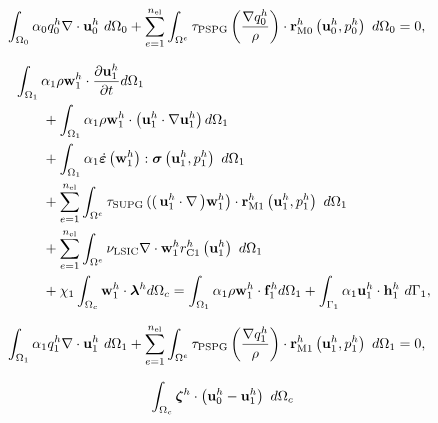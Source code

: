 \documentclass[tese_patricia]{subfiles}
\begin{document}
\begin{align}
	\begin{split}
		&	\int_{\Omega_{0}} \alpha_0 q_0^h \nabla \cdot \mathbf{u}_0^h \ d\Omega_{0} +
\sum_{e=1}^{n_{\mathrm{el}}} \int_{\Omega^e} \tau_{\mathrm{PSPG}} \left(\frac{\nabla q_0^h}{\rho}\right) \cdot \mathbf{r}_{\mathrm{M0}}^{h}\left(\mathbf{u}_0^h,p_0^h\right) \  d\Omega_{0} = 0,
		\label{eq:RC0}
	\end{split}
\end{align}


\begin{align}
	\begin{split}
		&\int_{\domain_1} \arlequinWFLocal \density \wlocalh \cdot \frac{\partial\ulocalh}{\partial t} d\domain_{1} \\ 
		&\qquad+
		\int_{\domain_1} \arlequinWFLocal \density \wlocalh \cdot  \left(\ulocalh \cdot \nabla\ulocalh\right) d\domain_{1}  \\ 
		&\qquad+	
		\int_{\domain_{1}} \arlequinWFLocal \strainratetensor \left(\wlocalh\right) : \stresstensor \left(\ulocalh,\plocalh\right)\ d\domain_{1} 
		\\ 
		&\qquad+ \sum_{e=1}^{\nel} \int_{\domainE} \SUPG  \left( \right(\ulocalh \cdot \nabla \left) \wlocalh\right) \cdot \resMomLocal\left(\ulocalh,\plocalh \right)\  d\domain_{1} \\ 
		&\qquad+\sum_{e=1}^{\nel} \int_{\domainE} \LSIC \nabla \cdot \wlocalh \resPreLocal
		\left(\ulocalh\right)\  d\domain_{1} \\
		&\qquad+ \chi_{1} \int_{\domain_c} \wlocalh \cdot \lagrangeMultiplier^{h} d\domain_{c}  = \int_{\domain_1} \arlequinWFLocal \density \wlocalh \cdot  \sbodyforce_{1}^{h} d\domain_{1} + \int_{\boundary_{1}} \arlequinWFLocal \ulocalh \cdot \straction_{1}^{h}\ d\boundary_{1},
		\label{eq:FinalSystem1}
	\end{split}
\end{align}


\begin{align}
	\begin{split}
		&	\int_{\Omega_{1}} \alpha_1 q_1^h \nabla \cdot \mathbf{u}_1^h \ d\Omega_{1} +
		\sum_{e=1}^{n_{\mathrm{el}}} \int_{\Omega^e} \tau_{\mathrm{PSPG}} \left(\frac{\nabla q_1^h}{\rho}\right) \cdot \mathbf{r}_{\mathrm{M1}}^{h} \left(\mathbf{u}_1^h,p_1^h\right) \  d\Omega_{1} = 0,
		\label{eq:RC1}
	\end{split}
\end{align}

\begin{align}
	\int_{\Omega_{c}}  \boldsymbol{\zeta}^h  \cdot \left(\mathbf{u}_0^h - \mathbf{u}_1^h \right) \ d\Omega_{c} 
		\label{eq:EqAcopla}
\end{align}
\end{document}
